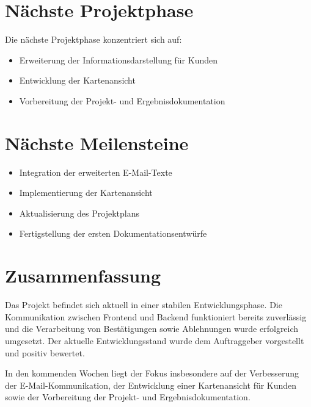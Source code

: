 \documentclass[a4paper,11pt]{article}
\begin{document}
\vspace{0.5cm}

\section{Nächste Projektphase}

Die nächste Projektphase konzentriert sich auf:

\begin{itemize}[leftmargin=1.2cm]
\item Erweiterung der Informationsdarstellung für Kunden
\item Entwicklung der Kartenansicht
\item Vorbereitung der Projekt- und Ergebnisdokumentation
\end{itemize}

\vspace{0.5cm}

\section{Nächste Meilensteine}

\begin{itemize}[leftmargin=1.2cm]
\item Integration der erweiterten E-Mail-Texte
\item Implementierung der Kartenansicht
\item Aktualisierung des Projektplans
\item Fertigstellung der ersten Dokumentationsentwürfe
\end{itemize}

\vspace{1cm}

\section{Zusammenfassung}

Das Projekt befindet sich aktuell in einer stabilen Entwicklungsphase. Die Kommunikation zwischen Frontend und Backend funktioniert bereits zuverlässig und die Verarbeitung von Bestätigungen sowie Ablehnungen wurde erfolgreich umgesetzt. Der aktuelle Entwicklungsstand wurde dem Auftraggeber vorgestellt und positiv bewertet.

In den kommenden Wochen liegt der Fokus insbesondere auf der Verbesserung der E-Mail-Kommunikation, der Entwicklung einer Kartenansicht für Kunden sowie der Vorbereitung der Projekt- und Ergebnisdokumentation.
\end{document}
